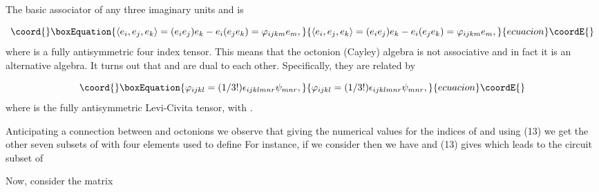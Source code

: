 \documentclass[a4paper,12pt]{article}
\begin{document}
The basic associator of any three imaginary units \coordHE{} and \coordHE{}
is

\begin{equation}\coord{}\boxEquation{
\langle e_{i},e_{j},e_{k}\rangle
=(e_{i}e_{j})e_{k}-e_{i}(e_{j}e_{k})=\varphi _{ijkm}e_{m},  \label{12}
}{
\langle e_{i},e_{j},e_{k}\rangle
=(e_{i}e_{j})e_{k}-e_{i}(e_{j}e_{k})=\varphi _{ijkm}e_{m},  }{ecuacion}\coordE{}\end{equation}
where \coordHE{} is a fully antisymmetric four index tensor. This
means that the octonion (Cayley) algebra is not associative and in fact it
is an alternative algebra. It turns out that \coordHE{} and \coordHE{} are dual to each other. Specifically, they are related by

\begin{equation}\coord{}\boxEquation{
\varphi _{ijkl}=(1/3!)\epsilon _{ijklmnr}\psi _{mnr},  \label{13}
}{
\varphi _{ijkl}=(1/3!)\epsilon _{ijklmnr}\psi _{mnr},  }{ecuacion}\coordE{}\end{equation}
where \coordHE{} is the fully antisymmetric Levi-Civita tensor,
with \coordHE{}.

Anticipating a connection between \coordHE{} and octonions we observe that
giving the numerical values \coordHE{} for the indices of \coordHE{} and
using (13) we get the other seven subsets of \coordHE{} with four elements used to
define \coordHE{} For instance, if we consider \coordHE{} then we have \coordHE{} and (13) gives \coordHE{} which leads to the circuit
subset \coordHE{} of \coordHE{}

Now, consider the matrix
\end{document}
